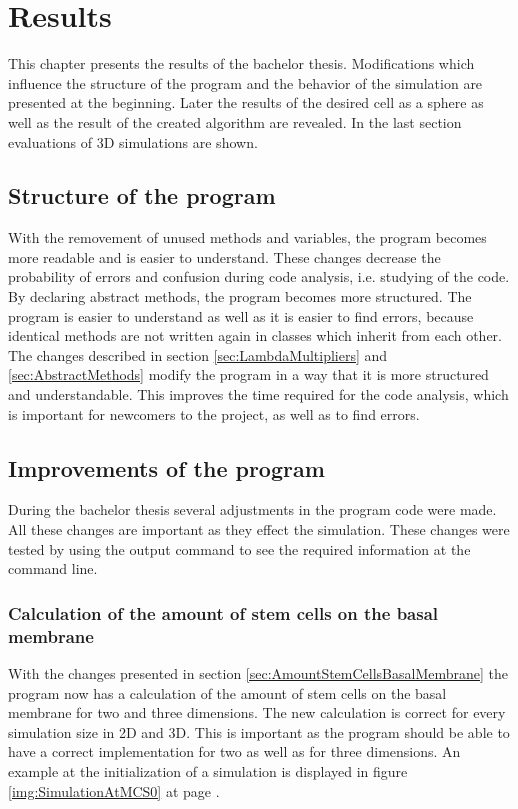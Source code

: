\chapter{Results}
This chapter presents the results of the bachelor thesis. Modifications which influence the structure of the program and the behavior of the simulation are presented at the beginning. Later the results of the desired cell as a sphere as well as the result of the created algorithm are revealed. In the last section evaluations of 3D simulations are shown.

\section{Structure of the program}
With the removement of unused methods and variables, the program becomes more readable and is easier to understand. These changes decrease the probability of errors and confusion during code analysis, i.e. studying of the code. By declaring abstract methods, the program becomes more structured. The program is easier to understand as well as it is easier to find errors, because identical methods are not written again in classes which inherit from each other. \newline
The changes described in section \ref{sec:LambdaMultipliers} and \ref{sec:AbstractMethods} modify the program in a way that it is more structured and understandable. This improves the time required for the code analysis, which is important for newcomers to the project, as well as to find errors.


\section{Improvements of the program}
During the bachelor thesis several adjustments in the program code were made. All these changes are important as they effect the simulation. These changes were tested by using the output command to see the required information at the command line. 
\subsection{Calculation of the amount of stem cells on the basal membrane}
With the changes presented in section \ref{sec:AmountStemCellsBasalMembrane} the program now has a calculation of the amount of stem cells on the basal membrane for two and three dimensions. The new calculation is correct for every simulation size in 2D and 3D. This is important as the program should be able to have a correct implementation for two as well as for three dimensions. An example at the initialization of a simulation is displayed in figure \ref{img:SimulationAtMCS0} at page \pageref{img:SimulationAtMCS0}.
